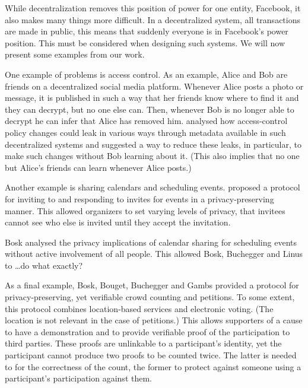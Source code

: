 While decentralization removes this position of power for one entity, \eg 
Facebook, it also makes many things more difficult.
In a decentralized system, all transactions are made in public, this means that 
suddenly everyone is in Facebook's power position.
This must be considered when designing such systems.
We will now present some examples from our work.

One example of problems is access control.
As an example, Alice and Bob are friends on a decentralized social media 
platform.
Whenever Alice posts a photo or message, it is published in such a way that her 
friends know where to find it and they can decrypt, but no one else can.
Then, whenever Bob is no longer able to decrypt he can infer that Alice has 
removed him.
\Textcite{PPACinPubFS} analysed how access-control policy changes could leak in 
various ways through metadata available in such decentralized systems and 
suggested a way to reduce these leaks, in particular, to make such changes 
without Bob learning about it.
(This also implies that no one but Alice's friends can learn whenever Alice 
posts.)

Another example is sharing calendars and scheduling events.
\Textcite{EventsInvitations} proposed a protocol for inviting to and responding 
to invites for events in a privacy-preserving manner.
This allowed organizers to set varying levels of privacy, \eg that invitees 
cannot see who else is invited until they accept the invitation.

Bosk analysed the privacy implications of calendar sharing for scheduling 
events without active involvement of all people.
This allowed Bosk, Buchegger and Linus to \dots do what exactly?

As a final example, Bosk, Bouget, Buchegger and Gambs provided a protocol for 
privacy-preserving, yet verifiable crowd counting and petitions.
To some extent, this protocol combines location-based services and electronic 
voting.
(The location is not relevant in the case of petitions.)
This allows supporters of a cause to have a demonstration and to provide 
verifiable proof of the participation to third parties.
These proofs are unlinkable to a participant's identity, yet the participant 
cannot produce two proofs to be counted twice.
The latter is needed to for the correctness of the count, the former to protect 
against someone using a participant's participation against them.



\begin{frame}[allowframebreaks]
  \printbibliography
\end{frame}
